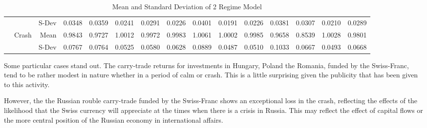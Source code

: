 \documentclass[12pt, a4paper, oneside]{article} %
\begin{document}
\begin{landscape}
\begin{table}[ht]
\begin{tabular}{llrrrrrrrrrrrrr}
 & & S-Dev &0.0348 & 0.0359 & 0.0241 & 0.0291 & 0.0226 & 0.0401 & 0.0191 & 0.0226 & 0.0381 & 0.0307 & 0.0210 & 0.0289 \\ 
  & \multirow{2}{*}{Crash}&Mean & 0.9843 & 0.9727 & 1.0012 & 0.9972 & 0.9983 & 1.0061 & 1.0002 & 0.9985 & 0.9658 & 0.8539 & 1.0028 & 0.9801 \\ 
  & & S-Dev& 0.0767 & 0.0764 & 0.0525 & 0.0580 & 0.0628 & 0.0889 & 0.0487 & 0.0510 & 0.1033 & 0.0667 & 0.0493 & 0.0668 \\ 
   \hline
\end{tabular}
\caption{Mean and Standard Deviation of 2 Regime Model}
\end{table}
\label{tabref:2StateProb}
\end{landscape}

Some particular cases stand out. The carry-trade returns for investments in Hungary, Poland the Romania, funded by the Swiss-Franc, tend to be rather modest in nature whether in a period of calm or crash. This is a little surprising given the publicity that has been given to this activity.  

However, the the Russian rouble carry-trade funded by the Swiss-Franc shows an exceptional loss in the crash, reflecting the effects of the likelihood that the Swiss currency will appreciate at the times when there is a crisis in Russia.  This may reflect the effect of capital flows or the more central position of the Russian economy in international affairs. 
 
 
 
\end{document}
